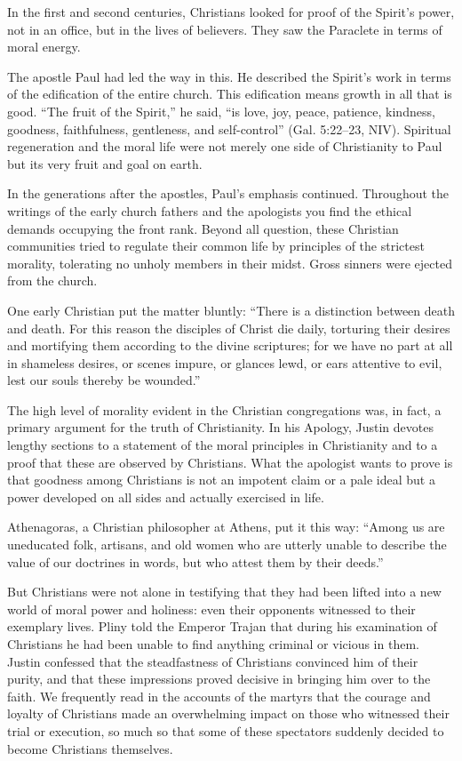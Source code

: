 In the first and second centuries, Christians looked for proof of the Spirit’s power, not in an
office, but in the lives of believers. They saw the Paraclete in terms of moral energy.

The apostle Paul had led the way in this. He described the Spirit’s work in terms of the edification
of the entire church. This edification means growth in all that is good. “The fruit of the Spirit,”
he said, “is love, joy, peace, patience, kindness, goodness, faithfulness, gentleness, and
self-control” (Gal. 5:22–23, NIV). Spiritual regeneration and the moral life were not merely one
side of Christianity to Paul but its very fruit and goal on earth.

In the generations after the apostles, Paul’s emphasis continued. Throughout the writings of the
early church fathers and the apologists you find the ethical demands occupying the front rank.
Beyond all question, these Christian communities tried to regulate their common life by principles
of the strictest morality, tolerating no unholy members in their midst. Gross sinners were ejected
from the church.

One early Christian put the matter bluntly: “There is a distinction between death and death. For
this reason the disciples of Christ die daily, torturing their desires and mortifying them according
to the divine scriptures; for we have no part at all in shameless desires, or scenes impure, or
glances lewd, or ears attentive to evil, lest our souls thereby be wounded.”

The high level of morality evident in the Christian congregations was, in fact, a primary argument
for the truth of Christianity. In his Apology, Justin devotes lengthy sections to a statement of the
moral principles in Christianity and to a proof that these are observed by Christians. What the
apologist wants to prove is that goodness among Christians is not an impotent claim or a pale ideal
but a power developed on all sides and actually exercised in life.

Athenagoras, a Christian philosopher at Athens, put it this way: “Among us are uneducated folk,
artisans, and old women who are utterly unable to describe the value of our doctrines in words, but
who attest them by their deeds.”

But Christians were not alone in testifying that they had been lifted into a new world of moral
power and holiness: even their opponents witnessed to their exemplary lives. Pliny told the Emperor
Trajan that during his examination of Christians he had been unable to find anything criminal or
vicious in them. Justin confessed that the steadfastness of Christians convinced him of their
purity, and that these impressions proved decisive in bringing him over to the faith. We frequently
read in the accounts of the martyrs that the courage and loyalty of Christians made an overwhelming
impact on those who witnessed their trial or execution, so much so that some of these spectators
suddenly decided to become Christians themselves.

